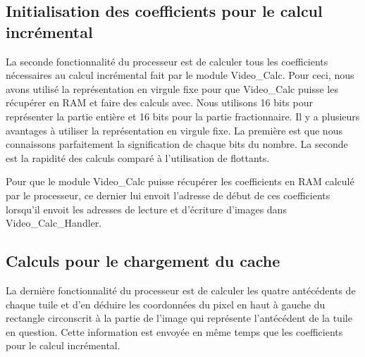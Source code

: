 {{{}

			\subsection*{Initialisation des coefficients pour le calcul incrémental}

{La seconde fonctionnalité du processeur est de calculer tous les coefficients nécessaires au calcul incrémental fait par le module Video\_Calc. Pour ceci, nous avons utilisé la représentation en virgule fixe pour que Video\_Calc puisse les récupérer en RAM et faire des calculs avec. Nous utilisons 16 bits pour représenter la partie entière et 16 bits pour la partie fractionnaire. Il y a plusieurs avantages à utiliser la représentation en virgule fixe. La première est que nous connaissons parfaitement la signification de chaque bits du nombre. La seconde est la rapidité des calculs comparé à l'utilisation de flottants.


Pour que le module Video\_Calc puisse récupérer les coefficients en RAM calculé par le processeur, ce dernier lui envoit l'adresse de début de ces coefficients lorsqu'il envoit les adresses de lecture et d'écriture d'images dans Video\_Calc\_Handler.
}

			\subsection*{Calculs pour le chargement du cache}
{La dernière fonctionnalité du processeur est de calculer les quatre antécédents de chaque tuile et d'en déduire les coordonnées du pixel en haut à gauche du rectangle circonscrit à la partie de l'image qui représente l'antécédent de la tuile en question.
Cette information est envoyée en même temps que les coefficients pour le calcul incrémental.

}}}
